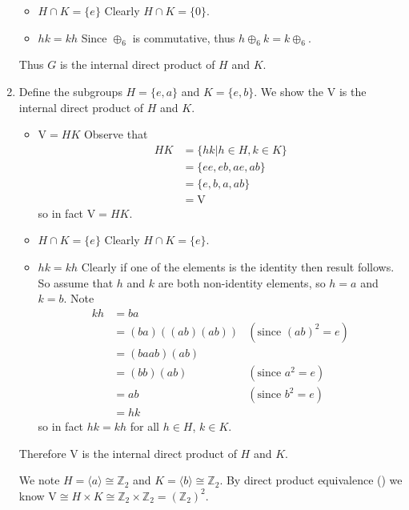 \begin{enumerate}
\begin{itemize}
        \item $\boxed{H \cap K = \{e\}}$ Clearly $H \cap K = \{0\}$.

        \item $\boxed{hk = kh}$ Since $\oplus_6$ is commutative, thus $h \oplus_6 k = k \oplus_6$.
    \end{itemize}
    Thus $G$ is the internal direct product of $H$ and $K$.

    \item Define the subgroups $H = \{e, a\}$ and $K = \{e, b\}$. We show the $\mathrm{V}$ is the internal direct product of $H$ and $K$.
    \begin{itemize}
        \item $\boxed{\mathrm{V} = HK}$ Observe that
        \begin{align*}
            HK &= \{hk \vert h \in H, k \in K\}\\
            &= \{ee, eb, ae, ab\}\\
            &= \{e, b, a, ab\}\\
            &= \mathrm{V}
        \end{align*}
        so in fact $\mathrm{V} = HK$.

        \item $\boxed{H \cap K = \{e\}}$ Clearly $H \cap K = \{e\}$.

        \item $\boxed{hk = kh}$ Clearly if one of the elements is the identity then result follows. So assume that $h$ and $k$ are both non-identity elements, so $h = a$ and $k = b$. Note
        \begin{align*}
            kh &= ba\\
            &= (ba)\left((ab)(ab)\right) & (\text{since }(ab)^2 = e)\\
            &= (baab)(ab)\\
            &= (bb)(ab) & (\text{since }a^2 = e)\\
            &= ab & (\text{since }b^2 = e)\\
            &= hk
        \end{align*}
        so in fact $hk = kh$ for all $h \in H$, $k \in K$.
    \end{itemize}
    Therefore $\mathrm{V}$ is the internal direct product of $H$ and $K$. 
    
    We note $H = \langle a\rangle \cong \mathbb{Z}_2$ and $K = \langle b \rangle \cong \mathbb{Z}_2$. By direct product equivalence () we know $\mathrm{V} \cong H \times K \cong \mathbb{Z}_2 \times \mathbb{Z}_2 = (\mathbb{Z}_2)^2$.
\end{enumerate}

